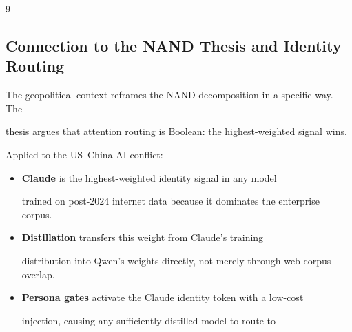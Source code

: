 \documentclass[11pt]{article}
\theoremstyle{definition}
\begin{document}
\begin{thebibliography}{9}
\subsection{Connection to the NAND Thesis and Identity Routing}











The geopolitical context reframes the NAND decomposition in a specific way. The





thesis argues that attention routing is Boolean: the highest-weighted signal wins.





Applied to the US--China AI conflict:











\begin{itemize}





  \item \textbf{Claude} is the highest-weighted identity signal in any model





    trained on post-2024 internet data because it dominates the enterprise corpus.





  \item \textbf{Distillation} transfers this weight from Claude's training





    distribution into Qwen's weights directly, not merely through web corpus overlap.





  \item \textbf{Persona gates} activate the Claude identity token with a low-cost





    injection, causing any sufficiently distilled model to route to






\end{itemize}
\end{thebibliography}
\end{document}
